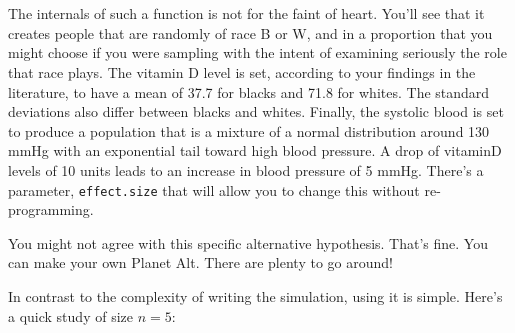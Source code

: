 \begin{example}
\begin{knitrout}
{\begin{kframe}
\begin{flushleft}
\hlstd{}{\ }{\ }{\ }{\ }{\ }{\ }{\ }{\ }\hlkeyword{*}{\ }\hlkeyword{(}\hlkeyword{-}{\ }\hlkeyword{)}\hlkeyword{/}\hlkeyword{)}\hspace*{\fill}\\
\hlstd{}{\ }{\ }{\ }{\ }\hlkeyword{(}\hlkeyword{(}\hlargument{=}{\ }\hlkeyword{,}{\ }\hlargument{=}{\ }\hlkeyword{,}{\ }\hlargument{=}{\ }\hlkeyword{(}\hlkeyword{)}\hlkeyword{)}\hlkeyword{)}\hspace*{\fill}\\
\hlstd{}\hlkeyword{\usebox{\hlnormalsizeboxclosebrace}}\mbox{}
\normalfont
\end{flushleft}
\end{kframe}}
\end{knitrout}

The internals of such a function is not for the faint of heart.  You'll see that it
creates people that are randomly of race B or W, and in a proportion
that you might choose if you were sampling with the intent of
examining seriously the role that race plays.  The vitamin D level is
set, according to your findings in the literature, to have a mean of
37.7 for blacks and 71.8 for whites.  The standard deviations also
differ between blacks and whites.  Finally, the systolic blood is set
to produce a population that is a mixture of a normal distribution
around 130 mmHg with an exponential tail toward high blood pressure. 
A drop of vitaminD levels of 10 units leads to an increase in blood
pressure of 5 mmHg.  There's a parameter, \texttt{effect.size} that
will allow you to change this without re-programming.

You might not agree with this specific alternative hypothesis.  That's
fine.  You can make your own Planet Alt.  There are plenty to go around!

In contrast to the complexity of writing the simulation, using it is
simple.  Here's a quick study of size $n=5$:
\begin{knitrout}
\end{knitrout}

\end{example}

